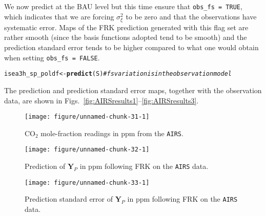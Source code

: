\documentclass{article}\usepackage[]{graphicx}\usepackage[]{color}
\makeatletter
\newcommand{\hlcom}[1]{\textcolor[rgb]{0.678,0.584,0.686}{\textit{#1}}}%
\newcommand{\hlstd}[1]{\textcolor[rgb]{0.345,0.345,0.345}{#1}}%
\newcommand{\hlkwb}[1]{\textcolor[rgb]{0.69,0.353,0.396}{#1}}%
\newcommand{\hlkwd}[1]{\textcolor[rgb]{0.737,0.353,0.396}{\textbf{#1}}}%
\newenvironment{kframe}{%
 \def\at@end@of@kframe{}%
 \ifinner\ifhmode%
  \def\at@end@of@kframe{\end{minipage}}%
  \begin{minipage}{\columnwidth}%
 \fi\fi%
 \def\FrameCommand##1{\hskip\@totalleftmargin \hskip-\fboxsep
 \colorbox{shadecolor}{##1}\hskip-\fboxsep
     \hskip-\linewidth \hskip-\@totalleftmargin \hskip\columnwidth}%
 \MakeFramed {\advance\hsize-\width
   \@totalleftmargin\z@ \linewidth\hsize
   \@setminipage}}%
 {\par\unskip\endMakeFramed%
 \at@end@of@kframe}
\newenvironment{knitrout}{}{} %
\renewcommand{\tt} {\texttt}
\newcommand{\Yvec}{\mathbf{Y}}
\makeatother
\begin{document}
\vspace{0.1in}

 We now predict at the BAU level but this time ensure that \tt{obs\_fs = TRUE}, which indicates that we are forcing $\sigma^2_\xi$ to be zero and that the observations have systematic error. Maps of the FRK prediction generated with this flag set are rather smooth (since the basis functions adopted tend to be smooth) and the prediction standard error tends to be higher compared to what one would obtain when setting \tt{obs\_fs = FALSE}.

\begin{knitrout}
\color{fgcolor}\begin{kframe}
\begin{alltt}
\hlstd{isea3h_sp_poldf} \hlkwb{<-} \hlkwd{predict}\hlstd{(S)}          \hlcom{# fs variation is in the observation model}
\end{alltt}
\end{kframe}
\end{knitrout}

The prediction and prediction standard error maps, together with the observation data, are shown in Figs.~\ref{fig:AIRSresults1}--\ref{fig:AIRSresults3}.



\begin{knitrout}
\color{fgcolor}\begin{figure}[t!]
\texttt{[image: figure/unnamed-chunk-31-1]} \caption{CO$_2$ mole-fraction readings in ppm from the \tt{AIRS}.\label{fig:AIRSresults1}}\label{fig:unnamed-chunk-31}
\end{figure}


\end{knitrout}

\begin{knitrout}
\color{fgcolor}\begin{figure}[t!]
\texttt{[image: figure/unnamed-chunk-32-1]} \caption{Prediction of $\Yvec_P$ in ppm following FRK on the \tt{AIRS} data.\label{fig:AIRSresults2}}\label{fig:unnamed-chunk-32}
\end{figure}


\end{knitrout}

\begin{knitrout}
\color{fgcolor}\begin{figure}[t!]
\texttt{[image: figure/unnamed-chunk-33-1]} \caption{Prediction standard error of $\Yvec_P$ in ppm following FRK on the \tt{AIRS} data.\label{fig:AIRSresults3}}\label{fig:unnamed-chunk-33}
\end{figure}


\end{knitrout}
\end{document}
